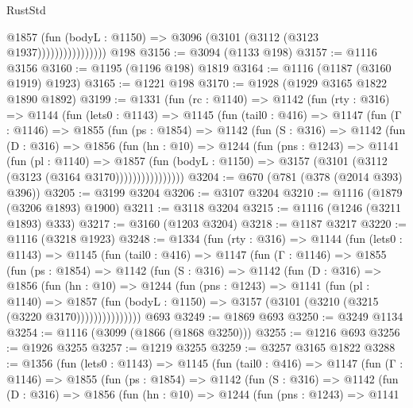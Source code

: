 \begin{lexlean}{RustStd}
\begin{coremodule}
{\begin{coremodule}
{{{{{{{{{{{                          @1857
                            (fun (bodyL : @1150) => @3096 (@3101 (@3112 (@3123 @1937))))))))))))))))
    @198
@3156 := @3094 (@1133 @198)
@3157 := @1116 @3156
@3160 := @1195 (@1196 @198) @1819
@3164 := @1116 (@1187 (@3160 @1919) @1923)
@3165 := @1221 @198
@3170 := @1928 (@1929 @3165 @1822 @1890 @1892)
@3199 := @1331
    (fun (rc : @1140) =>
    @1142
      (fun (rty : @316) =>
      @1144
        (fun (lets0 : @1143) =>
        @1145
          (fun (tail0 : @416) =>
          @1147
            (fun (Γ : @1146) =>
            @1855
              (fun (ps : @1854) =>
              @1142
                (fun (S : @316) =>
                @1142
                  (fun (D : @316) =>
                  @1856
                    (fun (hn : @10) =>
                    @1244
                      (fun (pns : @1243) =>
                      @1141
                        (fun (pl : @1140) =>
                        @1857
                          (fun (bodyL : @1150) =>
                          @3157 (@3101 (@3112 (@3123 (@3164 @3170))))))))))))))))
@3204 := @670 (@781 (@378 (@2014 @393) @396))
@3205 := @3199 @3204
@3206 := @3107 @3204
@3210 := @1116 (@1879 (@3206 @1893) @1900)
@3211 := @3118 @3204
@3215 := @1116 (@1246 (@3211 @1893) @333)
@3217 := @3160 (@1203 @3204)
@3218 := @1187 @3217
@3220 := @1116 (@3218 @1923)
@3248 := @1334
    (fun (rty : @316) =>
    @1144
      (fun (lets0 : @1143) =>
      @1145
        (fun (tail0 : @416) =>
        @1147
          (fun (Γ : @1146) =>
          @1855
            (fun (ps : @1854) =>
            @1142
              (fun (S : @316) =>
              @1142
                (fun (D : @316) =>
                @1856
                  (fun (hn : @10) =>
                  @1244
                    (fun (pns : @1243) =>
                    @1141
                      (fun (pl : @1140) =>
                      @1857
                        (fun (bodyL : @1150) =>
                        @3157 (@3101 (@3210 (@3215 (@3220 @3170)))))))))))))))
    @693
@3249 := @1869 @693
@3250 := @3249 @1134
@3254 := @1116 (@3099 (@1866 (@1868 @3250)))
@3255 := @1216 @693
@3256 := @1926 @3255
@3257 := @1219 @3255
@3259 := @3257 @3165 @1822
@3288 := @1356
    (fun (lets0 : @1143) =>
    @1145
      (fun (tail0 : @416) =>
      @1147
        (fun (Γ : @1146) =>
        @1855
          (fun (ps : @1854) =>
          @1142
            (fun (S : @316) =>
            @1142
              (fun (D : @316) =>
              @1856
                (fun (hn : @10) =>
                @1244
                  (fun (pns : @1243) =>
                  @1141
}}}}}}}}}}}
\end{coremodule}}
\end{coremodule}
\end{lexlean}
